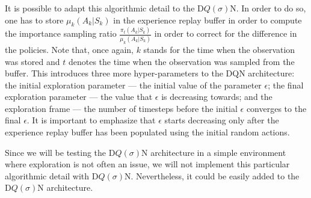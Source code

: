 It is possible to adapt this algorithmic detail to the D$Q(\sigma)$N.
In order to do so, one has to store $\mu_k(A_k| S_k)$ in the experience replay buffer in order to compute the importance sampling ratio $\frac{\pi_t(A_k|S_k)}{\mu_k(A_k|S_k)}$ in order to correct for the difference in the policies.
Note that, once again, $k$ stands for the time when the observation was stored and $t$ denotes the time when the observation was sampled from the buffer.
This introduces three more hyper-parameters to the DQN architecture: the initial exploration parameter --- the initial value of the parameter $\epsilon$;
the final exploration parameter --- the value that $\epsilon$ is decreasing towards; 
and the exploration frame --- the number of timesteps before the initial $\epsilon$ converges to the final $\epsilon$.
It is important to emphasize that $\epsilon$ starts decreasing only after the experience replay buffer has been populated using the initial random actions.

Since we will be testing the D$Q(\sigma)$N architecture in a simple environment where exploration is not often an issue, we will not implement this particular algorithmic detail with D$Q(\sigma)$N.
Nevertheless, it could be easily added to the D$Q(\sigma)$N architecture.

